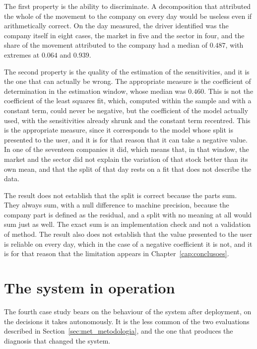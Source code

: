 The first property is the ability to discriminate. A decomposition that attributed the whole of the
movement to the company on every day would be useless even if arithmetically correct. On the day
measured, the driver identified was the company itself in eight cases, the market in five and the
sector in four, and the share of the movement attributed to the company had a median of $0.487$,
with extremes at $0.064$ and $0.939$.

The second property is the quality of the estimation of the sensitivities, and it is the one that
can actually be wrong. The appropriate measure is the coefficient of determination in the estimation
window, whose median was $0.460$. This is not the coefficient of the least squares fit, which,
computed within the sample and with a constant term, could never be negative, but the coefficient of
the model actually used, with the sensitivities already shrunk and the constant term recentred. This
is the appropriate measure, since it corresponds to the model whose split is presented to the user,
and it is for that reason that it can take a negative value. In one of the seventeen companies it
did, which means that, in that window, the market and the sector did not explain the variation of
that stock better than its own mean, and that the split of that day rests on a fit that does not
describe the data.

The result does not establish that the split is correct because the parts sum. They always sum,
with a null difference to machine precision, because the company part is defined as the residual,
and a split with no meaning at all would sum just as well. The exact sum is an implementation check
and not a validation of method. The result also does not establish that the value presented to the
user is reliable on every day, which in the case of a negative coefficient it is not, and it is for
that reason that the limitation appears in Chapter~\ref{cap:conclusoes}.

\section{The system in operation}
\label{sec:av_producao}

The fourth case study bears on the behaviour of the system after deployment, on the decisions it
takes autonomously. It is the less common of the two evaluations described in
Section~\ref{sec:met_metodologia}, and the one that produces the diagnosis that changed the
system.

